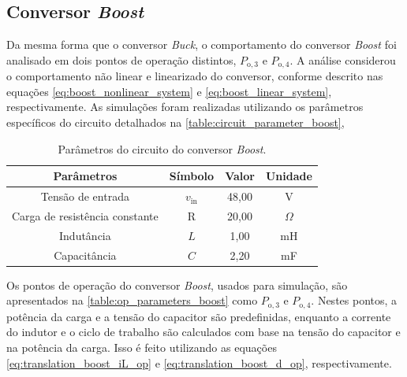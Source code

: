 \subsection{Conversor \textit{Boost}}

Da mesma forma que o conversor \textit{Buck}, o comportamento do conversor \textit{Boost} foi analisado em dois pontos de operação distintos, $P_{\mathrm{o}, 3}$ e $P_{\mathrm{o}, 4}$. A análise considerou o comportamento não linear e linearizado do conversor, conforme descrito nas equações \eqref{eq:boost_nonlinear_system} e \eqref{eq:boost_linear_system}, respectivamente. As simulações foram realizadas utilizando os parâmetros específicos do circuito detalhados na \autoref{table:circuit_parameter_boost},

\vspace{8pt}
\begin{table}[H]
  \centering
  \begin{tabular}{cccc}
    \toprule
    Parâmetros & Símbolo  & Valor & Unidade \\
    \midrule
    Tensão de entrada & $v_{\mathrm{in}}$ & 48,00 & V \\
    Carga de resistência constante & R & 20,00 & $\Omega$ \\
    Indutância & $L$ & 1,00 & mH \\
    Capacitância  & $C$ & 2,20 & mF \\
    \bottomrule
  \end{tabular}
  \caption{Parâmetros do circuito do conversor \textit{Boost}.}
  \label{table:circuit_parameter_boost}
\end{table}

Os pontos de operação do conversor \textit{Boost}, usados para simulação, são apresentados na \autoref{table:op_parameters_boost} como $P_{\mathrm{o}, 3}$ e $P_{\mathrm{o}, 4}$. Nestes pontos, a potência da carga e a tensão do capacitor são predefinidas, enquanto a corrente do indutor e o ciclo de trabalho são calculados com base na tensão do capacitor e na potência da carga. Isso é feito utilizando as equações \eqref{eq:translation_boost_iL_op} e \eqref{eq:translation_boost_d_op}, respectivamente.

